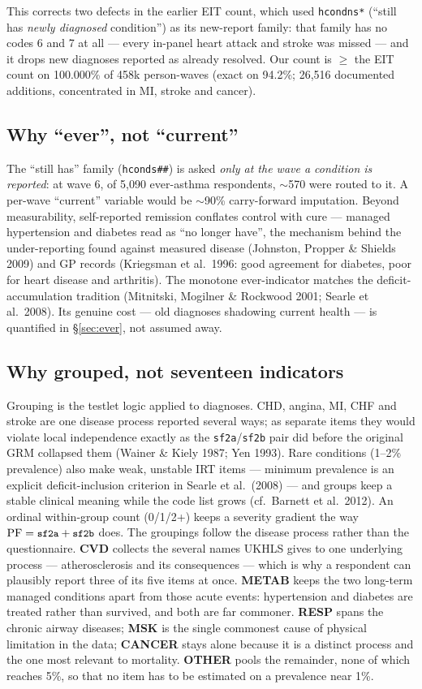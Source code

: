 \documentclass[11pt]{article}
\newcommand{\code}[1]{\texttt{\small #1}}
\begin{document}
This corrects two defects in the earlier EIT count, which used
\code{hcondns*} (``still has \emph{newly diagnosed} condition'') as its
new-report family: that family has no codes 6 and 7 at all --- every
in-panel heart attack and stroke was missed --- and it drops new diagnoses
reported as already resolved. Our count is $\ge$ the EIT count on
100.000\% of 458k person-waves (exact on 94.2\%; 26{,}516 documented
additions, concentrated in MI, stroke and cancer).

\subsection{Why ``ever'', not ``current''}
The ``still has'' family (\code{hconds\#\#}) is asked \emph{only at the wave
a condition is reported}: at wave 6, of 5{,}090 ever-asthma respondents,
$\sim$570 were routed to it. A per-wave ``current'' variable would be
$\sim$90\% carry-forward imputation. Beyond measurability, self-reported
remission conflates control with cure --- managed hypertension and diabetes
read as ``no longer have'', the mechanism behind the under-reporting found
against measured disease (Johnston, Propper \& Shields 2009) and GP records
(Kriegsman et al.\ 1996: good agreement for diabetes, poor for heart disease
and arthritis). The monotone ever-indicator matches the deficit-accumulation
tradition (Mitnitski, Mogilner \& Rockwood 2001; Searle et al.\ 2008). Its
genuine cost --- old diagnoses shadowing current health --- is quantified in
\S\ref{sec:ever}, not assumed away.

\subsection{Why grouped, not seventeen indicators}
\label{sec:groups}
Grouping is the testlet logic applied to diagnoses. CHD, angina, MI, CHF and
stroke are one disease process reported several ways; as separate items they
would violate local independence exactly as the \code{sf2a}/\code{sf2b} pair
did before the original GRM collapsed them (Wainer \& Kiely 1987; Yen 1993).
Rare conditions (1--2\% prevalence) also make weak, unstable IRT items ---
minimum prevalence is an explicit deficit-inclusion criterion in Searle et
al.\ (2008) --- and groups keep a stable clinical meaning while the code list
grows (cf.\ Barnett et al.\ 2012). An ordinal within-group count (0/1/2+)
keeps a severity gradient the way $\mathrm{PF}=\code{sf2a}+\code{sf2b}$ does.
The groupings follow the disease process rather than the questionnaire.
\textbf{CVD} collects the several names UKHLS gives to one underlying
process --- atherosclerosis and its consequences --- which is why a
respondent can plausibly report three of its five items at once.
\textbf{METAB} keeps the two long-term managed conditions apart from those
acute events: hypertension and diabetes are treated rather than survived, and
both are far commoner. \textbf{RESP} spans the chronic airway diseases;
\textbf{MSK} is the single commonest cause of physical limitation in the
data; \textbf{CANCER} stays alone because it is a distinct process and the
one most relevant to mortality. \textbf{OTHER} pools the remainder, none of
which reaches 5\%, so that no item has to be estimated on a prevalence near
1\%.
\end{document}
